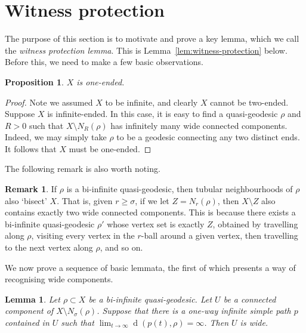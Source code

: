 \documentclass[11pt,a4paper]{amsart}
\DeclareMathOperator{\dist}{d}
\newtheorem{proposition}[theorem]{Proposition}
\newtheorem{lemma}[theorem]{Lemma}
\theoremstyle{definition}
\newtheorem{remark}[theorem]{Remark}
\begin{document}
\section{Witness protection}\label{sec:witness}

The purpose of this section is to motivate and prove a key lemma, which we call the \emph{witness protection lemma}. This is Lemma~\ref{lem:witness-protection} below. Before this, we need to make a few basic observations.


\begin{proposition}\label{prop:one-ended}
    $X$ is one-ended. 
\end{proposition}

\begin{proof}
    Note we assumed $X$ to be infinite, and clearly $X$ cannot be two-ended. Suppose $X$ is infinite-ended. In this case, it is easy to find a quasi-geodesic $\rho$ and $R > 0$ such that $X \setminus N_R(\rho)$ has infinitely many wide connected components. Indeed, we may simply take $\rho$ to be a geodesic connecting any two distinct ends. It follows that $X$ must be one-ended.
\end{proof}

The following remark is also worth noting. 

\begin{remark}\label{rmk:nbhds-bisect}
    If $\rho$ is a bi-infinite quasi-geodesic, then tubular neighbourhoods of $\rho$ also `bisect' $X$. That is, given $r \geq \sigma$, if we let $Z = N_r(\rho)$, then $X \setminus Z$ also contains exactly two wide connected components. This is because there exists a bi-infinite quasi-geodesic $\rho'$ whose vertex set is exactly $Z$, obtained by travelling along $\rho$, visiting every vertex in the $r$-ball around a given vertex, then travelling to the next vertex along $\rho$, and so on. 
\end{remark}

We now prove a sequence of basic lemmata, the first of which presents a way of recognising wide components. 

\begin{lemma}\label{lem:witness-implies-wide}
    Let $\rho \subset X$ be a bi-infinite quasi-geodesic. Let $U$ be a connected component of $X \setminus N_\sigma(\rho)$. Suppose that there is a one-way infinite simple path $p$ contained in $U$ such that $\lim_{t \to \infty} \dist(p(t), \rho) = \infty$. Then $U$ is wide. 
\end{lemma}
\end{document}
